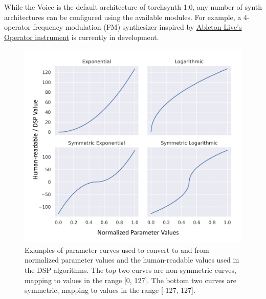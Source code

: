 While the Voice is the default architecture of torchsynth 1.0, any number of synth architectures can be configured using the available modules. For example, a 4-operator frequency modulation (FM) \cite{chowning1973synthesis} synthesizer inspired by \href{https://www.ableton.com/en/packs/operator/}{Ableton Live's Operator instrument} is currently in development.

\begin{figure}[thb]
    \centering
    \includegraphics[width=0.80\linewidth]{Hyperparam_4.pdf}
    \caption{Examples of parameter curves used to convert to and from normalized parameter values and the human-readable values used in the DSP algorithms. The top two curves are non-symmetric curves, mapping to values in the range [0, 127]. The bottom two curves are symmetric, mapping to values in the range [-127, 127].}
    \label{fig:parameter_curves}
\end{figure}

